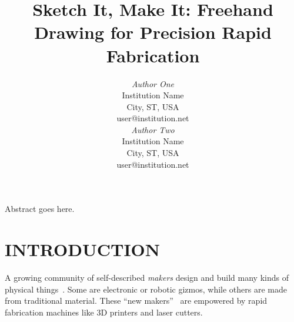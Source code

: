 \documentclass{article}
\begin{document}

\toappear{}



\title{Sketch It, Make It: Freehand Drawing for Precision Rapid Fabrication}

\author{
\parbox[t]{9cm}{\centering
	     {\em Author One}\\
	     Institution Name\\
             City, ST, USA\\
	     user@institution.net}
\parbox[t]{9cm}{\centering
	     {\em Author Two}\\
	     Institution Name\\
             City, ST, USA\\
	     user@institution.net}
}

\maketitle

\abstract Abstract goes here. 






\section{INTRODUCTION}

A growing community of self-described \textit{makers} design and build
many kinds of physical things~\cite{gershenfeld-fab}. Some are
electronic or robotic gizmos, while others are made from traditional
material. These ``new makers''~\cite{gross-new-makers} are empowered
by rapid fabrication machines like 3D printers and laser cutters.
\end{document}
